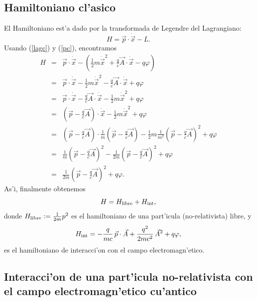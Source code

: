 \subsection{Hamiltoniano cl'asico} 

El Hamiltoniano est'a dado por la transformada de Legendre del Lagrangiano:  
\begin{equation}
H=\vec{p}\cdot \dot{\vec{x}}-L .
\end{equation}
Usando (\ref{lagc}) y (\ref{pc}), encontramos
\begin{eqnarray}
H &=&\vec{p}\cdot \dot{\vec{x}}-\left( \frac{1}{2}m\dot{\vec{x}}%
^2+\frac{q}{c}\vec{A}\cdot \dot{\vec{x}}-q\varphi \right) \\
&=&\vec{p}\cdot \dot{\vec{x}}-\frac{1}{2}m\dot{\vec{x}}^2-\frac{q%
}{c}\vec{A}\cdot \dot{\vec{x}}+q\varphi \\
&=&\vec{p}\cdot \dot{\vec{x}}-\frac{q}{c}\vec{A}\cdot
\dot{\vec{x}}-\frac{1}{2}m\dot{\vec{x}}^2+q\varphi \\
&=&\left( \vec{p}-\frac{q}{c}\vec{A}\right) \cdot \dot{\vec{x}}-%
\frac{1}{2}m\dot{\vec{x}}^2+q\varphi \\
&=&\left( \vec{p}-\frac{q}{c}\vec{A}\right) \cdot \frac{1}{m}\left( 
\vec{p}-\frac{q}{c}\vec{A}\right) -\frac{1}{2}m\frac{1}{m^2}\left( 
\vec{p}-\frac{q}{c}\vec{A}\right)^2+q\varphi \\
&=&\frac{1}{m}\left( \vec{p}-\frac{q}{c}\vec{A}\right)^2-\frac{1}{2m%
}\left( \vec{p}-\frac{q}{c}\vec{A}\right)^2+q\varphi \\
&=&\frac{1}{2m}\left( \vec{p}-\frac{q}{c}\vec{A}\right)^2+q\varphi .
\end{eqnarray}
As'i, finalmente obtenemos
\begin{equation}
H=H_{\rm libre}+H_{\rm int},
\end{equation} 
donde $H_{\rm libre}:=\frac{1}{2m} p^2$ es el hamiltoniano de una part'icula
(no-relativista) libre, y
\begin{equation}\label{Hintnorel}
H_{\rm int} =-\frac{q}{mc}\,\vec{p}\cdot\vec{A}
+\frac{q^2}{2mc^2}\,\vec{A}^2+q\varphi ,
\end{equation} 
es el hamiltoniano de interacci'on con el campo electromagn'etico.

\subsection{Interacci'on de una part'icula no-relativista con el campo
electromagn'etico cu'antico}


